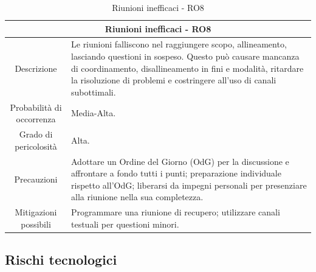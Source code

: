 \documentclass[12pt, a4paper]{article}
\begin{document}
\begin{table}[H]
    \centering
    \renewcommand{\arraystretch}{1.3}
    \begin{tabularx}{\textwidth}{|c|X|}
        \hline
        \multicolumn{2}{|c|}{\textbf{Riunioni inefficaci - RO8}} \\ \hline
        Descrizione & 
        Le riunioni falliscono nel raggiungere scopo, allineamento, lasciando questioni in sospeso. Questo può causare mancanza di coordinamento, disallineamento in fini e modalità, ritardare la risoluzione di problemi e costringere all'uso di canali subottimali.
        \\ \hline
        Probabilità di occorrenza & Media-Alta.
        \\ \hline
        Grado di pericolosità & Alta.
        \\ \hline
        Precauzioni & 
        Adottare un Ordine del Giorno (OdG) per la discussione e affrontare a fondo tutti i punti; preparazione individuale rispetto all'OdG; liberarsi da impegni personali per presenziare alla riunione nella sua completezza.
        \\ \hline
        Mitigazioni possibili &
        Programmare una riunione di recupero; utilizzare canali testuali per questioni minori.
        \\ \hline
    \end{tabularx}
    \caption{Riunioni inefficaci - RO8}
\end{table}


\subsection{Rischi tecnologici}
\end{document}
